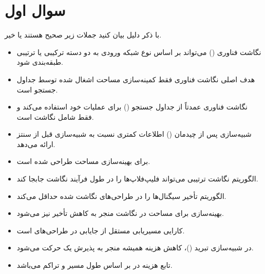 \section{سوال اول}



با ذکر دلیل بیان کنید جملات زیر صحیح هستند یا خیر.
\begin{itemize}
	\item نگاشت فناوری () می‌تواند بر اساس نوع شبکه ورودی به دو دسته ترکیبی یا ترتیبی طبقه‌بندی شود.
	\item هدف اصلی نگاشت فناوری  فقط کمینه‌سازی مساحت اشغال شده توسط جداول جستجو است.
	\item نگاشت فناوری  عمدتاً از جداول جستجو () برای عملیات خود استفاده می‌کند و فقط شامل نگاشت  است.
	\item شبیه‌سازی پس از چیدمان () اطلاعات کمتری نسبت به شبیه‌سازی قبل از سنتز ارائه می‌دهد.
	\item {} برای بهینه‌سازی مساحت طراحی شده است.
	\item الگوریتم نگاشت ترتیبی می‌تواند فلیپ‌فلاپ‌ها را در طول فرآیند نگاشت جابجا کند.
	\item الگوریتم  تأخیر سیگنال‌ها را در طراحی‌های نگاشت شده حداقل می‌کند.
	\item بهینه‌سازی برای مساحت در نگاشت منجر به کاهش تأخیر نیز می‌شود.
	\item کارایی مسیریابی مستقل از جایابی در طراحی‌های  است.
	\item در شبیه‌سازی تبرید ()، کاهش هزینه همیشه منجر به پذیرش یک حرکت می‌شود.
	\item تابع هزینه در  بر اساس طول مسیر و تراکم می‌باشد.
\end{itemize}













